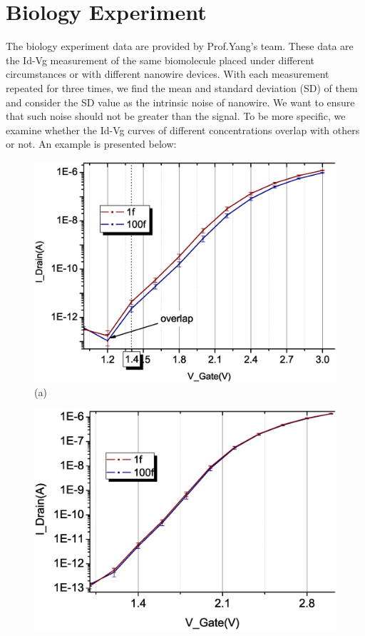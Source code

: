 \section{Biology Experiment}
The biology experiment data are provided by Prof.Yang's team.
These data are the Id-Vg measurement of the same biomolecule placed under different circumstances or with different nanowire devices.
With each measurement repeated for three times, we find the mean and standard deviation (SD) of them and consider the SD value as the intrinsic noise of nanowire.
We want to ensure that such noise should not be greater than the signal.
To be more specific, we examine whether the Id-Vg curves of different concentrations overlap with others or not.
An example is presented below:
\begin{figure}[!htb]
    \centering
    \begin{minipage}[t]{1\textwidth}
        \centering
        \includegraphics[scale=0.4]{images/chapter3/208_devices/L2-8_log.eps}
        (a)
    \end{minipage}
    \vfill
    \begin{minipage}[t]{1\textwidth}
        \centering
        \includegraphics[scale=0.4]{images/chapter3/208_devices/L2-10_log.eps}

\end{minipage}
\end{figure}

